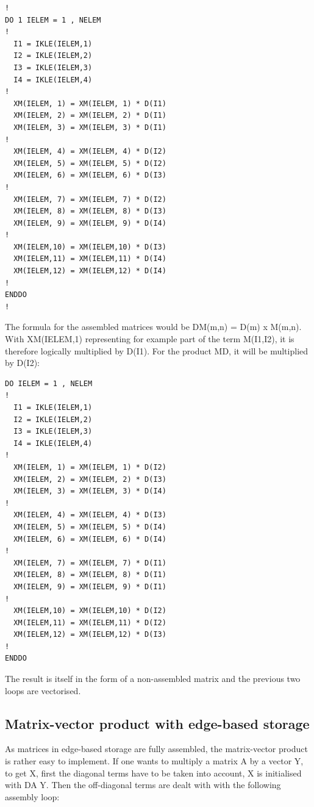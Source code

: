 
\begin{lstlisting}[language=TelFortran]
!
DO 1 IELEM = 1 , NELEM
!
  I1 = IKLE(IELEM,1)
  I2 = IKLE(IELEM,2)
  I3 = IKLE(IELEM,3)
  I4 = IKLE(IELEM,4)
!
  XM(IELEM, 1) = XM(IELEM, 1) * D(I1)
  XM(IELEM, 2) = XM(IELEM, 2) * D(I1)
  XM(IELEM, 3) = XM(IELEM, 3) * D(I1)
!
  XM(IELEM, 4) = XM(IELEM, 4) * D(I2)
  XM(IELEM, 5) = XM(IELEM, 5) * D(I2)
  XM(IELEM, 6) = XM(IELEM, 6) * D(I3)
!
  XM(IELEM, 7) = XM(IELEM, 7) * D(I2)
  XM(IELEM, 8) = XM(IELEM, 8) * D(I3)
  XM(IELEM, 9) = XM(IELEM, 9) * D(I4)
!
  XM(IELEM,10) = XM(IELEM,10) * D(I3)
  XM(IELEM,11) = XM(IELEM,11) * D(I4)
  XM(IELEM,12) = XM(IELEM,12) * D(I4)
!
ENDDO
!
\end{lstlisting}

The formula for the assembled matrices would be DM(m,n) = D(m) x M(m,n). With
XM(IELEM,1) representing for example part of the term M(I1,I2), it is therefore
logically multiplied by D(I1). For the product MD, it will be multiplied by
D(I2):


\begin{lstlisting}[language=TelFortran]
DO IELEM = 1 , NELEM
!
  I1 = IKLE(IELEM,1)
  I2 = IKLE(IELEM,2)
  I3 = IKLE(IELEM,3)
  I4 = IKLE(IELEM,4)
!
  XM(IELEM, 1) = XM(IELEM, 1) * D(I2)
  XM(IELEM, 2) = XM(IELEM, 2) * D(I3)
  XM(IELEM, 3) = XM(IELEM, 3) * D(I4)
!
  XM(IELEM, 4) = XM(IELEM, 4) * D(I3)
  XM(IELEM, 5) = XM(IELEM, 5) * D(I4)
  XM(IELEM, 6) = XM(IELEM, 6) * D(I4)
!
  XM(IELEM, 7) = XM(IELEM, 7) * D(I1)
  XM(IELEM, 8) = XM(IELEM, 8) * D(I1)
  XM(IELEM, 9) = XM(IELEM, 9) * D(I1)
!
  XM(IELEM,10) = XM(IELEM,10) * D(I2)
  XM(IELEM,11) = XM(IELEM,11) * D(I2)
  XM(IELEM,12) = XM(IELEM,12) * D(I3)
!
ENDDO
\end{lstlisting}

The result is itself in the form of a non-assembled matrix and the previous two
loops are vectorised.

\subsection{Matrix-vector product with edge-based storage}

As matrices in edge-based storage are fully assembled, the matrix-vector
product is rather easy to implement. If one wants to multiply a matrix A by a
vector Y, to get X, first the diagonal terms have to be taken into account, X
is initialised with DA Y. Then the off-diagonal terms are dealt with with the
following assembly loop:

